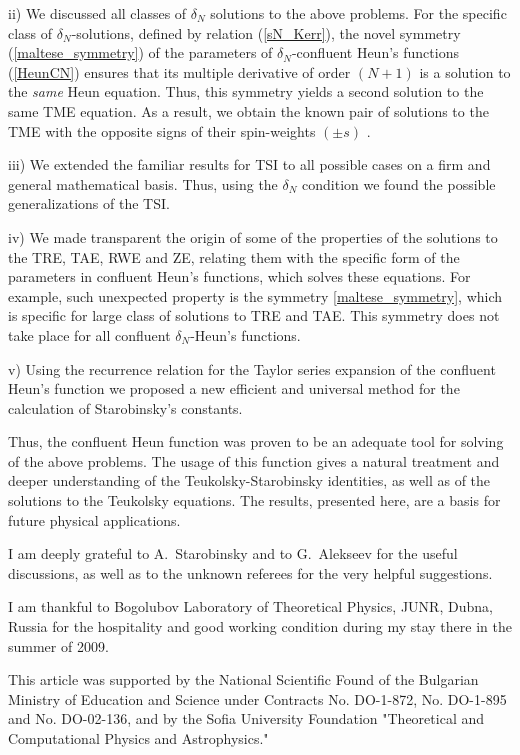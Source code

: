 \documentclass[prd,aps,twocolumn,leterpaper,preprintnumbers]{revtex4}
\numberwithin{equation}{section}
\begin{document}
ii) We discussed all classes of $\delta_N$ solutions
to the above problems.
For the specific class of $\delta_N$-solutions, defined by relation (\ref{sN_Kerr}),
the novel symmetry (\ref{maltese_symmetry}) of the parameters of
$\delta_N$-confluent Heun's functions (\ref{HeunCN}) ensures that its multiple
derivative of order $(N+1)$ is a solution to the {\em same} Heun equation.
Thus, this symmetry yields a second solution to the same TME equation.
As a result, we obtain the known pair of solutions to the TME with the opposite signs
of their spin-weights $(\pm s)$ \cite{Teukolsky}.

iii) We extended the familiar results for TSI to all
possible cases on a firm and general mathematical basis.
Thus, using the $\delta_N$ condition we found the possible
generalizations of the TSI.


iv) We made transparent the origin of some of the properties
of the solutions to the TRE, TAE, RWE and ZE,
relating them with the specific form of the parameters in confluent Heun's functions,
which solves these equations.
For example, such unexpected property is the symmetry \eqref{maltese_symmetry},
which is specific for large class of solutions to TRE and TAE. This
symmetry does not take place for all confluent $\delta_N$-Heun's functions.

v) Using the recurrence relation for the Taylor series expansion of the confluent Heun's function
we proposed a new efficient and universal method for the calculation of Starobinsky's constants.

Thus, the confluent Heun function was proven to be
an adequate tool for solving of the above problems.
The usage of this function gives a natural treatment
and deeper understanding of the Teukolsky-Starobinsky identities,
as well as of the solutions to the Teukolsky equations.
The results, presented here, are a basis for future physical applications.

\begin{acknowledgments}
I am deeply grateful to A.~Starobinsky and to G.~Alekseev for the useful discussions,
as well as to the unknown referees for the very helpful suggestions.

I am thankful to Bogolubov Laboratory of Theoretical Physics, JUNR, Dubna, Russia for the hospitality
and good working condition during my stay there in the summer of 2009.

This article was supported by the National Scientific Found of the Bulgarian Ministry of
Education and Science under Contracts No. DO-1-872, No. DO-1-895 and No. DO-02-136,
and by the Sofia University Foundation "Theoretical
and Computational Physics and Astrophysics."
\end{acknowledgments}
\end{document}
